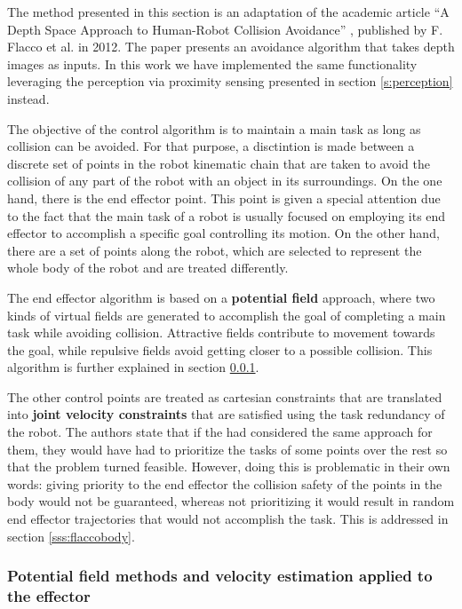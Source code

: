 The method presented in this section is an adaptation of the academic article ``A Depth Space Approach to Human-Robot Collision Avoidance'' \cite{flacco2012depth}, published by F. Flacco et al. in 2012. The paper presents an avoidance algorithm that takes depth images as inputs. In this work we have implemented the same functionality leveraging the perception via proximity sensing presented in section \ref{s:perception} instead.

The objective of the control algorithm is to maintain a main task as long as collision can be avoided. For that purpose, a disctintion is made between a discrete set of points in the robot kinematic chain that are taken to avoid the collision of any part of the robot with an object in its surroundings. On the one hand, there is the end effector point. This point is given a special attention due to the fact that the main task of a robot is usually focused on employing its end effector to accomplish a specific goal controlling its motion. On the other hand, there are a set of points along the robot, which are selected to represent the whole body of the robot and are treated differently.

The end effector algorithm is based on a \textbf{potential field} approach, where two kinds of virtual fields are generated to accomplish the goal of completing a main task while avoiding collision. Attractive fields contribute to movement towards the goal, while repulsive fields avoid getting closer to a possible collision. This algorithm is further explained in section  \ref{sss:flaccorepulsive}.

The other control points are treated as cartesian constraints that are translated into \textbf{joint velocity constraints} that are satisfied using the task redundancy of the robot. The authors state that if the had considered the same approach for them, they would have had to prioritize the tasks of some points over the rest so that the problem turned feasible. However, doing this is problematic in their own words: giving priority to the end effector the collision safety of the points in the body would not be guaranteed, whereas not prioritizing it would result in random end effector trajectories that would not accomplish the task. This is addressed in section \ref{sss:flaccobody}.

\subsubsection{Potential field methods and velocity estimation applied to the effector}
\label{sss:flaccorepulsive}


